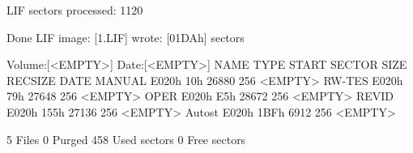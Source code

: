 \begin{DoxyPre}LIF sectors processed: 1120\end{DoxyPre}



\begin{DoxyPre}Done LIF image: [1.LIF] wrote: [01DAh] sectors\end{DoxyPre}



\begin{DoxyPre}Volume:[<EMPTY>] Date:[<EMPTY>]
NAME         TYPE   START SECTOR        SIZE    RECSIZE   DATE
MANUAL      E020h            10h       26880        256   <EMPTY>
RW-TES      E020h            79h       27648        256   <EMPTY>
OPER        E020h            E5h       28672        256   <EMPTY>
REVID       E020h           155h       27136        256   <EMPTY>
Autost      E020h           1BFh        6912        256   <EMPTY>\end{DoxyPre}



\begin{DoxyPre}       5 Files
       0 Purged
     458 Used sectors
       0 Free sectors\end{DoxyPre}



\begin{DoxyPre}\end{DoxyPre}




 